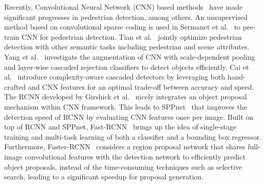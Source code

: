\documentclass[10pt,journal,compsoc,twoside]{IEEEtran}
\begin{document}
Recently, Convolutional Neural Network (CNN) based methods~\cite{TiaEtAl:cvpr15,TiaEtAl:iccv15,HosEtAl:cvpr15,CaiSabVas:iccv15,ZhaEtAl:eccv16} have made significant progresses in pedestrian detection, among others. An unsupervised method based on convolutional sparse coding is used in Sermanet et al.~\cite{SerEtAl:cvpr13} to pre-train CNN for pedestrian detection. Tian et al.~\cite{TiaEtAl:cvpr15} jointly optimize pedestrian detection with other semantic tasks including pedestrian and scene attributes. Yang et al.~\cite{YanChoLin:cvpr16} investigate the augmentation of CNN with scale-dependent pooling and layer-wise cascaded rejection classifiers to detect objects efficiently. Cai et al.~\cite{CaiSabVas:iccv15} introduce complexity-aware cascaded detectors by leveraging both hand-crafted and CNN features for an optimal trade-off between accuracy and speed. The RCNN developed by Girshick et al.~\cite{GirEtAl:cvpr14} nicely integrates an object proposal mechanism within CNN framework. This leads to SPPnet~\cite{HeEtAl:eccv14} that improves the detection speed of RCNN by evaluating CNN features once per image. Built on top of RCNN and SPPnet, Fast-RCNN~\cite{Gir:iccv15} brings up the idea of single-stage training and multi-task learning of both a classifier and a bounding box regressor. Furthermore, Faster-RCNN~\cite{RenEtAl:nips15} considers a region proposal network that shares full-image convolutional features with the detection network to efficiently predict object proposals, instead of the time-consuming techniques such as selective search, leading to a significant speedup for proposal generation.
\end{document}
